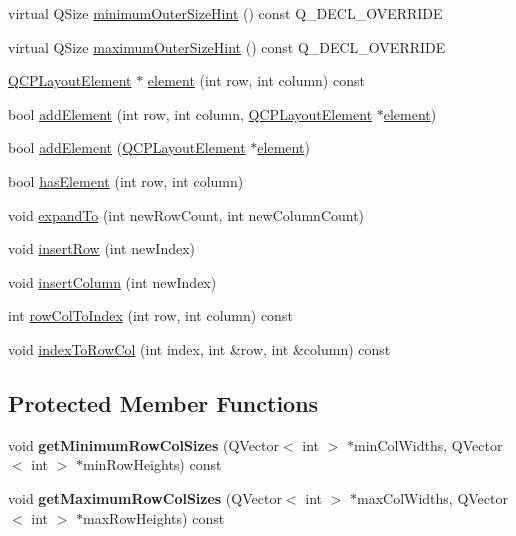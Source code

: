 \begin{DoxyCompactItemize}
\item 
virtual Q\+Size \hyperlink{classQCPLayoutGrid_a0438bc58b4d3894d01db95b08d4268df}{minimum\+Outer\+Size\+Hint} () const Q\+\_\+\+D\+E\+C\+L\+\_\+\+O\+V\+E\+R\+R\+I\+DE
\item 
virtual Q\+Size \hyperlink{classQCPLayoutGrid_a41ce0014c220d77b909e2ca937f0e599}{maximum\+Outer\+Size\+Hint} () const Q\+\_\+\+D\+E\+C\+L\+\_\+\+O\+V\+E\+R\+R\+I\+DE
\item 
\hyperlink{classQCPLayoutElement}{Q\+C\+P\+Layout\+Element} $\ast$ \hyperlink{classQCPLayoutGrid_a602b426609b4411cf6a93c3ddf3a381a}{element} (int row, int column) const
\item 
bool \hyperlink{classQCPLayoutGrid_adff1a2ca691ed83d2d24a4cd1fe17012}{add\+Element} (int row, int column, \hyperlink{classQCPLayoutElement}{Q\+C\+P\+Layout\+Element} $\ast$\hyperlink{classQCPLayoutGrid_a602b426609b4411cf6a93c3ddf3a381a}{element})
\item 
bool \hyperlink{classQCPLayoutGrid_a4c44025dd25acd27e053cadfd448ad7b}{add\+Element} (\hyperlink{classQCPLayoutElement}{Q\+C\+P\+Layout\+Element} $\ast$\hyperlink{classQCPLayoutGrid_a602b426609b4411cf6a93c3ddf3a381a}{element})
\item 
bool \hyperlink{classQCPLayoutGrid_ab0cf4f7edc9414a3bfaddac0f46dc0a0}{has\+Element} (int row, int column)
\item 
void \hyperlink{classQCPLayoutGrid_a886c0dcbabd51a45da399e044552b685}{expand\+To} (int new\+Row\+Count, int new\+Column\+Count)
\item 
void \hyperlink{classQCPLayoutGrid_a48af3dd7c3a653d9c3d7dd99bd02e838}{insert\+Row} (int new\+Index)
\item 
void \hyperlink{classQCPLayoutGrid_a1e880a321dbe8b43b471ccd764433dc4}{insert\+Column} (int new\+Index)
\item 
int \hyperlink{classQCPLayoutGrid_a682ba76f130810ffd294032a1bfbcfcb}{row\+Col\+To\+Index} (int row, int column) const
\item 
void \hyperlink{classQCPLayoutGrid_a577223db920e2acb34bc1091080c76d1}{index\+To\+Row\+Col} (int index, int \&row, int \&column) const
\end{DoxyCompactItemize}
\subsection*{Protected Member Functions}
\begin{DoxyCompactItemize}
\item 
\mbox{\label{classQCPLayoutGrid_a4b9a251919936f127a63fc1b9911cd4e}} 
void {\bfseries get\+Minimum\+Row\+Col\+Sizes} (Q\+Vector$<$ int $>$ $\ast$min\+Col\+Widths, Q\+Vector$<$ int $>$ $\ast$min\+Row\+Heights) const
\item 
\mbox{\label{classQCPLayoutGrid_a9be77011ec5b5dfbe7fbda126659e1eb}} 
void {\bfseries get\+Maximum\+Row\+Col\+Sizes} (Q\+Vector$<$ int $>$ $\ast$max\+Col\+Widths, Q\+Vector$<$ int $>$ $\ast$max\+Row\+Heights) const
\end{DoxyCompactItemize}
